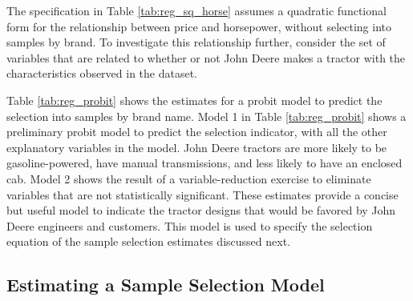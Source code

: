 \documentclass[11pt]{paper}
\begin{document}
The specification in 
Table \ref{tab:reg_sq_horse}
assumes a quadratic functional form for
the relationship between price and horsepower, 
without selecting into samples by brand.
% 
To investigate this relationship further, 
consider the set of variables that are related to
whether or not John Deere makes a tractor
with the characteristics observed in the dataset. 



Table \ref{tab:reg_probit} 
shows the estimates for a probit model to predict the selection
into samples by brand name.
% 
Model 1 in Table \ref{tab:reg_probit} 
shows a preliminary probit model to predict the selection indicator,
with all the other explanatory variables in the model.
John Deere tractors are more likely to be gasoline-powered,
have manual transmissions, and less likely to have an enclosed cab.
% 
Model 2 shows the result of a variable-reduction exercise
to eliminate variables that are not statistically significant.
These estimates provide a concise but useful model to
indicate the tractor designs that would be favored by John Deere
engineers and customers.
This model is used to specify the selection equation
of the sample selection estimates discussed next. 
 
\subsection{Estimating a Sample Selection Model}








\end{document}
